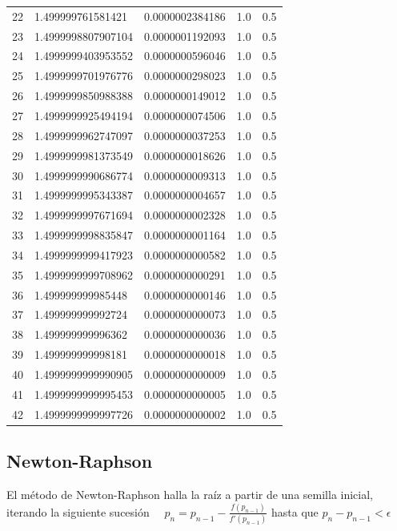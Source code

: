 \documentclass[titlepage,a4paper]{article}
\begin{document}
\begin{center}
\begin{tabular}{| c | l | c | c | c |}
22      & 1.499999761581421  &  0.0000002384186  &  1.0  &  0.5 \\
23      & 1.4999998807907104  &  0.0000001192093  &  1.0  &  0.5 \\
24      & 1.4999999403953552  &  0.0000000596046  &  1.0  &  0.5 \\
25      & 1.4999999701976776  &  0.0000000298023  &  1.0  &  0.5 \\
26      & 1.4999999850988388  &  0.0000000149012  &  1.0  &  0.5 \\
27      & 1.4999999925494194  &  0.0000000074506  &  1.0  &  0.5 \\
28      & 1.4999999962747097  &  0.0000000037253  &  1.0  &  0.5 \\
29      & 1.4999999981373549  &  0.0000000018626  &  1.0  &  0.5 \\
30      & 1.4999999990686774  &  0.0000000009313  &  1.0  &  0.5 \\
31      & 1.4999999995343387  &  0.0000000004657  &  1.0  &  0.5 \\
32      & 1.4999999997671694  &  0.0000000002328  &  1.0  &  0.5 \\
33      & 1.4999999998835847  &  0.0000000001164  &  1.0  &  0.5 \\
34      & 1.4999999999417923  &  0.0000000000582  &  1.0  &  0.5 \\
35      & 1.4999999999708962  &  0.0000000000291  &  1.0  &  0.5 \\
36      & 1.499999999985448  &  0.0000000000146  &  1.0  &  0.5 \\
37      & 1.499999999992724  &  0.0000000000073  &  1.0  &  0.5 \\
38      & 1.499999999996362  &  0.0000000000036  &  1.0  &  0.5 \\
39      & 1.499999999998181  &  0.0000000000018  &  1.0  &  0.5 \\
40      & 1.4999999999990905  &  0.0000000000009  &  1.0  &  0.5 \\
41      & 1.4999999999995453  &  0.0000000000005  &  1.0  &  0.5 \\
42      & 1.4999999999997726  &  0.0000000000002  &  1.0  &  0.5 \\


           \hline
    \end{tabular}
\end{center}

\subsection{Newton-Raphson}\label{sec:NewtonRaphson}
El método de Newton-Raphson halla la raíz a partir de una semilla inicial, iterando la siguiente sucesión
$\quad p_{n} =p_{n-1}-\frac{f (p_{n-1})}{f'(p_{n-1})}$ hasta que 
$p_{n}-p_{n-1} < \mbox{$\epsilon$}$
\end{document}
